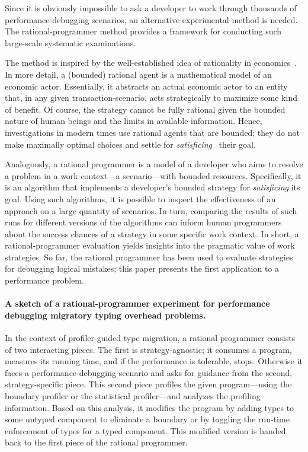 Since it is obviously impossible to ask a developer to work through thousands of
performance-debugging scenarios, an alternative experimental method is needed.
The rational-programmer method provides a framework for conducting such
large-scale systematic examinations.

The method is inspired by the well-established idea of rationality in
economics~\cite{mill1874essays, henrich2001search}.  In more detail, a (bounded)
rational agent is a mathematical model of an economic actor. Essentially, it
abstracts an actual economic actor to an entity that, in any given
transaction-scenario, acts strategically to maximize some kind of benefit.  Of
course, the strategy cannot be fully rational given the bounded nature of human
beings and the limits in available information. Hence, investigations in modern
times use rational agents that are bounded; they do not make maximally optimal
choices and settle for \emph{satisficing}~\cite{hs:satisfice} their goal.

Analogously, a rational programmer is a model of a developer who aims to
resolve a problem in a work context---a scenario---with bounded resources.
Specifically, it is an algorithm that implements a developer's bounded
strategy for \emph{satisficing} its goal. Using such algorithms, it is
possible to inspect the effectiveness of an approach on a large quantity
of scenarios. In turn, comparing the results of such runs for different
versions of the algorithms can inform human programmers about the success
chances of a strategy in some specific work context. In short, a
rational-programmer evaluation yields insights into the pragmatic value of
work strategies. So far, the rational programmer has been used to evaluate
strategies for debugging logical mistakes; this paper presents the first
application to a performance problem. 

\paragraph{A sketch of a rational-programmer experiment for performance
debugging migratory typing overhead problems.}  In the context of profiler-guided
type migration, a rational programmer consists of two interacting pieces.  The
first is strategy-agnostic; it consumes a program, measures its running time,
and if the performance is tolerable, stops. Otherwise it faces a
performance-debugging scenario and asks for guidance from the second,
strategy-specific piece. This second piece profiles the given program---using
the boundary profiler or the statistical profiler---and analyzes the
profiling information. Based on this analysis, it modifies the program by adding
types to some untyped component to eliminate a boundary or by toggling the run-time
enforcement of types for a typed component. This modified version is handed back
to the first piece of the rational programmer. 

